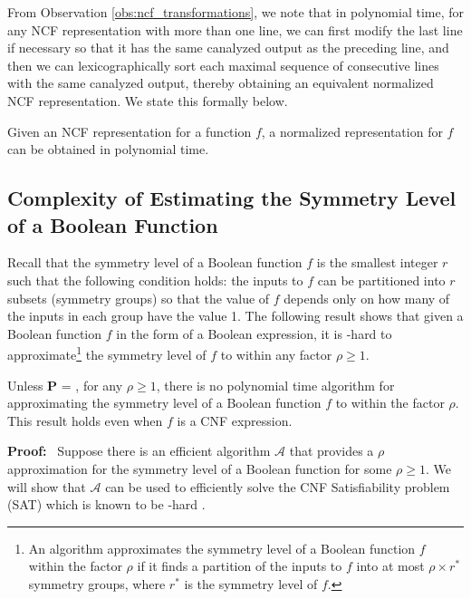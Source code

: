 \medskip
From Observation \ref{obs:ncf_transformations},
we note that in polynomial time, for any NCF representation with more than one line,
we can first modify the last line if necessary so that it has the same canalyzed output as the preceding line,
and then we can lexicographically sort
each maximal sequence of consecutive lines with the same canalyzed output,
thereby obtaining an equivalent normalized NCF representation.
We state this formally below.

\begin{observation}\label{obs:normalization_poly}
Given an NCF representation for a function $f$, a normalized
representation for $f$ can be obtained in polynomial time. \QED
\end{observation}

\subsection{Complexity of Estimating the Symmetry Level of a 
Boolean Function}
\label{sse:symmetry_level_hardness}

Recall that the symmetry level of a Boolean function $f$ is the smallest
integer $r$ such that the following condition holds:
the  inputs to $f$ can be partitioned into $r$ subsets 
(symmetry groups) so that the value of $f$ depends only on 
how many of the inputs in each group have the value 1.
The following result shows that given a Boolean function $f$
in the form of a Boolean expression, it is \cnp-hard to 
approximate\footnote{An algorithm approximates the symmetry
level of a Boolean function $f$ within the factor $\rho$ if it finds a
partition of the inputs to $f$ into at most $\rho \times r^*$ symmetry
groups, where $r^*$ is the symmetry level of $f$.}
the symmetry level of $f$ to within any factor $\rho \geq 1$.

\newcommand{\cala}{\mbox{$\mathcal{A}$}}

\begin{theorem}\label{thm:approx_sym_level_hard}
Unless \textbf{P} = \cnp,
for any $\rho \geq 1$, there is no polynomial time 
algorithm for approximating the 
symmetry level of a Boolean function $f$ to within the factor $\rho$.
This result holds even when $f$ is a CNF expression.
\end{theorem}

\noindent
\textbf{Proof:}~ Suppose there is an efficient algorithm \cala{} 
that provides a $\rho$ approximation for the symmetry level
of a Boolean function for some $\rho \geq 1$.
We will show that \cala{} can be used to efficiently solve
the CNF Satisfiability problem (SAT) which is known 
to be \cnp-hard \cite{GJ-1979}.

